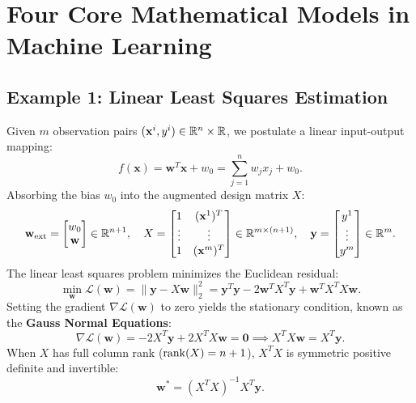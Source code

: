 \FloatBarrier
\section{Four Core Mathematical Models in Machine Learning}

\subsection{Example 1: Linear Least Squares Estimation}
Given $m$ observation pairs $(\mathbf{x}^i, y^i) \in \mathbb{R}^n \times \mathbb{R}$, we postulate a linear input-output mapping:
\begin{equation}
    f(\mathbf{x}) = \mathbf{w}^T \mathbf{x} + w_0 = \sum_{j=1}^n w_j x_j + w_0.
\end{equation}
Absorbing the bias $w_0$ into the augmented design matrix $X$:
\begin{equation}
    \mathbf{w}_{\text{ext}} = \begin{bmatrix} w_0 \\ \mathbf{w} \end{bmatrix} \in \mathbb{R}^{n+1}, \quad
    X = \begin{bmatrix} 1 & (\mathbf{x}^1)^T \\ \vdots & \vdots \\ 1 & (\mathbf{x}^m)^T \end{bmatrix} \in \mathbb{R}^{m \times (n+1)}, \quad
    \mathbf{y} = \begin{bmatrix} y^1 \\ \vdots \\ y^m \end{bmatrix} \in \mathbb{R}^m.
\end{equation}
The linear least squares problem minimizes the Euclidean residual:
\begin{equation}
    \min_{\mathbf{w}} \mathcal{L}(\mathbf{w}) = \|\mathbf{y} - X\mathbf{w}\|_2^2 = \mathbf{y}^T \mathbf{y} - 2\mathbf{w}^T X^T \mathbf{y} + \mathbf{w}^T X^T X \mathbf{w}.
\end{equation}
Setting the gradient $\nabla \mathcal{L}(\mathbf{w})$ to zero yields the stationary condition, known as the \textbf{Gauss Normal Equations}:
\begin{equation}
    \nabla \mathcal{L}(\mathbf{w}) = -2 X^T \mathbf{y} + 2 X^T X \mathbf{w} = \mathbf{0} \implies X^T X \mathbf{w} = X^T \mathbf{y}.
\end{equation}
When $X$ has full column rank ($\operatorname{rank}(X) = n+1$), $X^T X$ is symmetric positive definite and invertible:
\begin{equation}
    \mathbf{w}^* = (X^T X)^{-1} X^T \mathbf{y}.
\end{equation}

